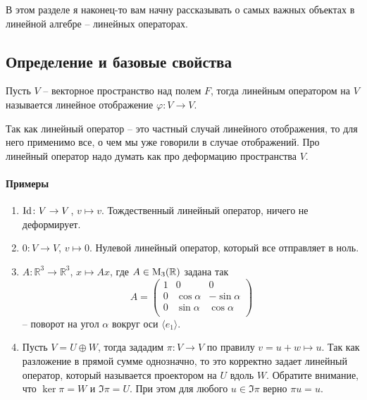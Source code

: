 В этом разделе я наконец-то вам начну рассказывать о самых важных объектах в линейной алгебре -- линейных операторах.

\subsection{Определение и базовые свойства}
\label{section::LinearOpDef}

\begin{definition}
Пусть $V$ -- векторное пространство над полем $F$, тогда линейным оператором на $V$ называется линейное отображение $\varphi \colon V\to V$.
\end{definition}

Так как линейный оператор -- это частный случай линейного отображения, то для него применимо все, о чем мы уже говорили в случае отображений.
Про линейный оператор надо думать как про деформацию пространства $V$.

\paragraph{Примеры}

\begin{enumerate}
\item $\operatorname{Id}\colon V\to V$, $v\mapsto v$.
Тождественный линейный оператор, ничего не деформирует.

\item $0\colon V\to V$, $v \mapsto 0$.
Нулевой линейный оператор, который все отправляет в ноль.

\item $A\colon \mathbb R^3 \to \mathbb R^3$, $x\mapsto Ax$, где $A\in \operatorname{M}_{3}(\mathbb R)$ задана так
\[
A = 
\begin{pmatrix}
{1}&{0}&{0}\\
{0}&{\cos \alpha}&{-\sin \alpha}\\
{0}&{\sin \alpha}&{\cos \alpha}\\
\end{pmatrix}
\]
-- поворот на угол $\alpha$ вокруг оси $\langle e_1\rangle$.

\item Пусть $V = U\oplus W$, тогда зададим $\pi\colon V\to V$ по правилу $v = u + w \mapsto u$.
Так как разложение в прямой сумме однозначно, то это корректно задает линейный оператор, который называется проектором на $U$ вдоль $W$.
Обратите внимание, что $\ker \pi = W$ и $\Im \pi = U$.
При этом для любого $u\in \Im\pi$ верно $\pi u = u$.
\end{enumerate}

